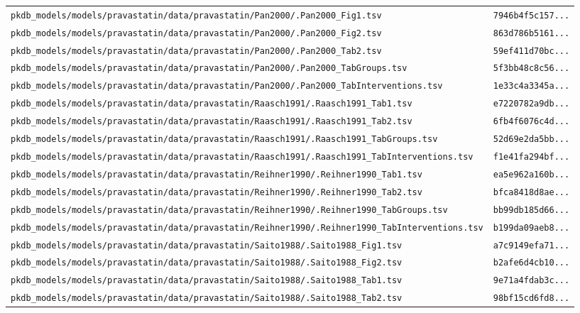 \documentclass{article}
\begin{document}
\begin{longtable}{ll}
\texttt{pkdb\_models/models/pravastatin/data/pravastatin/Pan2000/.Pan2000\_Fig1.tsv} & \texttt{7946b4f5c157...} \\
\texttt{pkdb\_models/models/pravastatin/data/pravastatin/Pan2000/.Pan2000\_Fig2.tsv} & \texttt{863d786b5161...} \\
\texttt{pkdb\_models/models/pravastatin/data/pravastatin/Pan2000/.Pan2000\_Tab2.tsv} & \texttt{59ef411d70bc...} \\
\texttt{pkdb\_models/models/pravastatin/data/pravastatin/Pan2000/.Pan2000\_TabGroups.tsv} & \texttt{5f3bb48c8c56...} \\
\texttt{pkdb\_models/models/pravastatin/data/pravastatin/Pan2000/.Pan2000\_TabInterventions.tsv} & \texttt{1e33c4a3345a...} \\
\texttt{pkdb\_models/models/pravastatin/data/pravastatin/Raasch1991/.Raasch1991\_Tab1.tsv} & \texttt{e7220782a9db...} \\
\texttt{pkdb\_models/models/pravastatin/data/pravastatin/Raasch1991/.Raasch1991\_Tab2.tsv} & \texttt{6fb4f6076c4d...} \\
\texttt{pkdb\_models/models/pravastatin/data/pravastatin/Raasch1991/.Raasch1991\_TabGroups.tsv} & \texttt{52d69e2da5bb...} \\
\texttt{pkdb\_models/models/pravastatin/data/pravastatin/Raasch1991/.Raasch1991\_TabInterventions.tsv} & \texttt{f1e41fa294bf...} \\
\texttt{pkdb\_models/models/pravastatin/data/pravastatin/Reihner1990/.Reihner1990\_Tab1.tsv} & \texttt{ea5e962a160b...} \\
\texttt{pkdb\_models/models/pravastatin/data/pravastatin/Reihner1990/.Reihner1990\_Tab2.tsv} & \texttt{bfca8418d8ae...} \\
\texttt{pkdb\_models/models/pravastatin/data/pravastatin/Reihner1990/.Reihner1990\_TabGroups.tsv} & \texttt{bb99db185d66...} \\
\texttt{pkdb\_models/models/pravastatin/data/pravastatin/Reihner1990/.Reihner1990\_TabInterventions.tsv} & \texttt{b199da09aeb8...} \\
\texttt{pkdb\_models/models/pravastatin/data/pravastatin/Saito1988/.Saito1988\_Fig1.tsv} & \texttt{a7c9149efa71...} \\
\texttt{pkdb\_models/models/pravastatin/data/pravastatin/Saito1988/.Saito1988\_Fig2.tsv} & \texttt{b2afe6d4cb10...} \\
\texttt{pkdb\_models/models/pravastatin/data/pravastatin/Saito1988/.Saito1988\_Tab1.tsv} & \texttt{9e71a4fdab3c...} \\
\texttt{pkdb\_models/models/pravastatin/data/pravastatin/Saito1988/.Saito1988\_Tab2.tsv} & \texttt{98bf15cd6fd8...} \\

\end{longtable}
\end{document}
